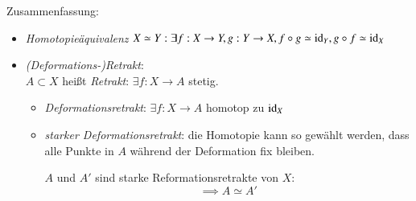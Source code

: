 \documentclass[a4paper,10pt]{scrartcl}
\begin{document}
\begin{seg}{Zusammenfassung:}
\begin{itemize}
 \item \emph{Homotopieäquivalenz} $X\simeq Y: \exists f: X\to Y, g: Y\to X, f\circ g \simeq \operatorname{id}_Y, g\circ f \simeq \operatorname{id}_X$
 \item \emph{(Deformations-)Retrakt}:\\
$A\subset X$ heißt \emph{Retrakt}: $\exists f: X\to A$ stetig.
\begin{itemize}
\item \emph{Deformationsretrakt}: $\exists f: X\to A$ homotop zu $\operatorname{id}_X$
\item \emph{starker Deformationsretrakt}: die Homotopie kann so gewählt werden, dass alle Punkte in $A$ während der Deformation fix bleiben.
\begin{figure}[H]
\centering
 \fixme[fig46]
\caption{}
\end{figure}
$A$ und $A'$ sind starke Reformationsretrakte von $X$:
\[
 \implies A \simeq A'
\]
\end{itemize}
\end{itemize}
\end{seg}
\end{document}
